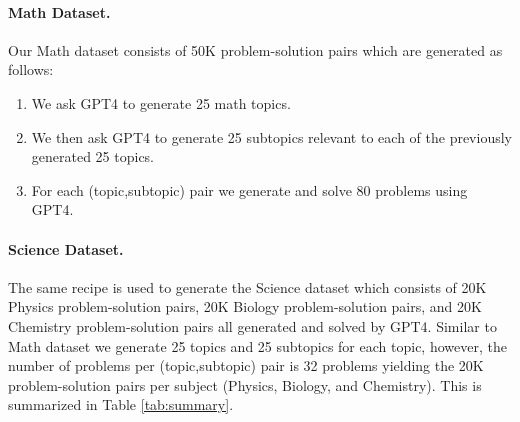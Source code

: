 \paragraph{Math Dataset.} Our Math dataset consists of 50K problem-solution pairs which are generated as follows:

\begin{enumerate}
	\item We ask GPT4 to generate 25 math topics.
	\item We then ask GPT4 to generate 25 subtopics relevant to each of the previously generated 25 topics.
	\item For each (topic,subtopic) pair we generate and solve 80 problems using GPT4.
\end{enumerate}

\paragraph{Science Dataset.} The same recipe is used to generate the Science dataset which consists of 20K Physics problem-solution pairs, 20K Biology problem-solution pairs, and 20K Chemistry problem-solution pairs all generated and solved by GPT4. Similar to Math dataset we generate 25 topics and 25 subtopics for each topic, however, the number of problems per (topic,subtopic) pair is 32 problems yielding the 20K problem-solution pairs per subject (Physics, Biology, and Chemistry). This is summarized in Table \ref{tab:summary}.



